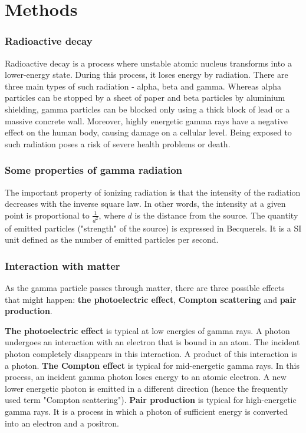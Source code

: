 
\chapter{Methods\label{chap:methods}}
\subsection{Radioactive decay}
Radioactive decay is a process where unstable atomic nucleus transforms into a lower-energy state.
During this process, it loses energy by radiation.
There are three main types of such radiation - alpha, beta and gamma.
Whereas alpha particles can be stopped by a sheet of paper and beta particles by aluminium shielding, gamma particles can be blocked only using a thick block of lead or a massive concrete wall.
Moreover, highly energetic gamma rays have a negative effect on the human body, causing damage on a cellular level.
Being exposed to such radiation poses a risk of severe health problems or death.

\subsection{Some properties of gamma radiation}
The important property of ionizing radiation is that the intensity of the radiation decreases with the inverse square law.
In other words, the intensity at a given point is proportional to $\frac{1}{d^{2}}$, where $d$ is the distance from the source.
The quantity of emitted particles ("strength" of the source) is expressed in Becquerels.
It is a SI unit defined as the number of emitted particles per second.

\subsection{Interaction with matter}
As the gamma particle passes through matter, there are three possible effects that might happen:
\textbf{the photoelectric effect}, \textbf{Compton scattering} and \textbf{pair production}.

\textbf{The photoelectric effect} is typical at low energies of gamma rays. A photon undergoes an interaction with an electron that is bound in an atom. The incident photon completely disappears in this interaction. A product of this interaction is a photon.
\textbf{The Compton effect} is typical for mid-energetic gamma rays. In this process, an incident gamma photon loses energy to an atomic electron. A new lower energetic photon is emitted in a different direction (hence the frequently used term "Compton scattering").
\textbf{Pair production} is typical for high-energetic gamma rays. It is a process in which a photon of sufficient energy is converted into an electron and a positron.

